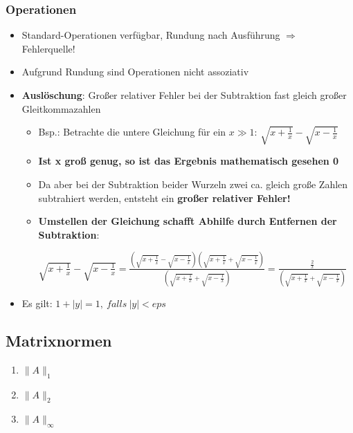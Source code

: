 \documentclass[10pt,a4paper]{article}
\newcommand{\norm}[1]{\lVert#1\rVert}
\begin{document}
	\subsubsection{Operationen}
	\begin{itemize}
		\item Standard-Operationen verfügbar, Rundung nach Ausführung $\Rightarrow$ Fehlerquelle!
		\item Aufgrund Rundung sind Operationen nicht assoziativ
		\item \textbf{Auslöschung}: Großer relativer Fehler bei der Subtraktion fast gleich großer Gleitkommazahlen
		\begin{itemize}
			\item Bsp.: Betrachte die untere Gleichung für ein $x \gg 1$: $\sqrt{x + \frac{1}{x}} - \sqrt{x - \frac{1}{x}}$
			\item \textbf{Ist x groß genug, so ist das Ergebnis mathematisch gesehen 0}
			\item Da aber bei der Subtraktion beider Wurzeln zwei ca. gleich große Zahlen subtrahiert werden, entsteht ein \textbf{großer relativer Fehler!}
			\item \textbf{Umstellen der Gleichung schafft Abhilfe durch Entfernen der Subtraktion}:
			\begin{center}
				$\sqrt{x + \frac{1}{x}} - \sqrt{x - \frac{1}{x}}
				= \frac{(\sqrt{x + \frac{1}{x}} - \sqrt{x - \frac{1}{x}})(\sqrt{x + \frac{1}{x}} + \sqrt{x - \frac{1}{x}})}{(\sqrt{x + \frac{1}{x}} + \sqrt{x - \frac{1}{x}})}
				= \frac{\frac{2}{x}}{(\sqrt{x + \frac{1}{x}} + \sqrt{x - \frac{1}{x}})}$
			\end{center}
		\end{itemize}
		\item Es gilt: $1 + |y| = 1,\ falls\ |y| < eps$
	\end{itemize}

	\subsection{Matrixnormen}
	\begin{enumerate}
		\item{ $\norm{A}_1$}
		\item{ $\norm{A}_2$}
		\item{ $\norm{A}_\infty$}
	\end{enumerate}
	
\end{document}
